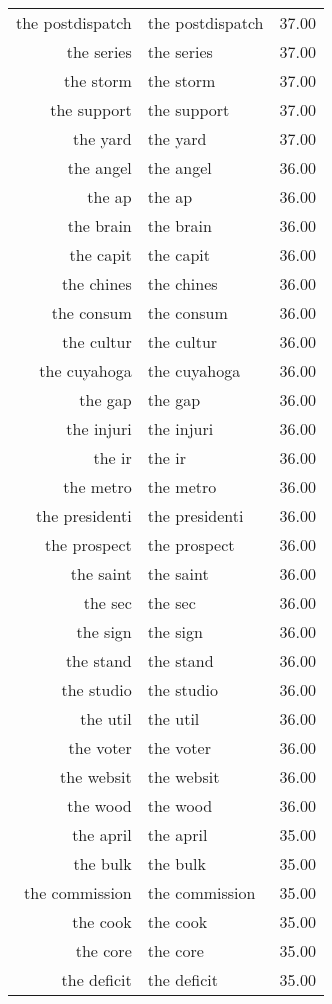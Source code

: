 \begin{table}[ht]
\begin{tabular}{rlr}
  the postdispatch & the postdispatch & 37.00 \\ 
  the series & the series & 37.00 \\ 
  the storm & the storm & 37.00 \\ 
  the support & the support & 37.00 \\ 
  the yard & the yard & 37.00 \\ 
  the angel & the angel & 36.00 \\ 
  the ap & the ap & 36.00 \\ 
  the brain & the brain & 36.00 \\ 
  the capit & the capit & 36.00 \\ 
  the chines & the chines & 36.00 \\ 
  the consum & the consum & 36.00 \\ 
  the cultur & the cultur & 36.00 \\ 
  the cuyahoga & the cuyahoga & 36.00 \\ 
  the gap & the gap & 36.00 \\ 
  the injuri & the injuri & 36.00 \\ 
  the ir & the ir & 36.00 \\ 
  the metro & the metro & 36.00 \\ 
  the presidenti & the presidenti & 36.00 \\ 
  the prospect & the prospect & 36.00 \\ 
  the saint & the saint & 36.00 \\ 
  the sec & the sec & 36.00 \\ 
  the sign & the sign & 36.00 \\ 
  the stand & the stand & 36.00 \\ 
  the studio & the studio & 36.00 \\ 
  the util & the util & 36.00 \\ 
  the voter & the voter & 36.00 \\ 
  the websit & the websit & 36.00 \\ 
  the wood & the wood & 36.00 \\ 
  the april & the april & 35.00 \\ 
  the bulk & the bulk & 35.00 \\ 
  the commission & the commission & 35.00 \\ 
  the cook & the cook & 35.00 \\ 
  the core & the core & 35.00 \\ 
  the deficit & the deficit & 35.00 \\ 

\end{tabular}
\end{table}
